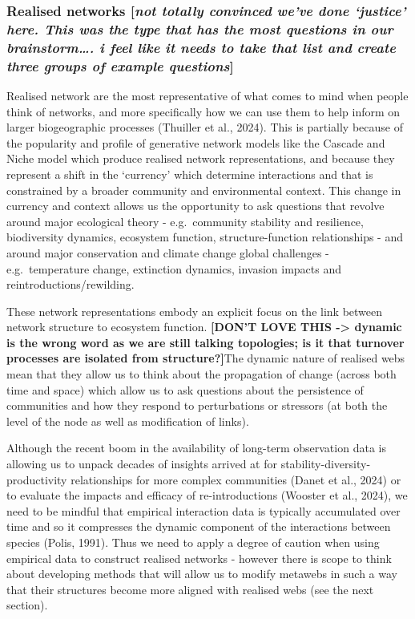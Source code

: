 \documentclass[
]{article}
\begin{document}
\subsubsection{\texorpdfstring{Realised networks {[}\emph{not totally
convinced we've done `justice' here. This was the type that has the most
questions in our brainstorm\ldots. i feel like it needs to take that
list and create three groups of example
questions}{]}}{Realised networks {[}not totally convinced we've done `justice' here. This was the type that has the most questions in our brainstorm\ldots. i feel like it needs to take that list and create three groups of example questions{]}}}\label{realised-networks-not-totally-convinced-weve-done-justice-here.-this-was-the-type-that-has-the-most-questions-in-our-brainstorm.-i-feel-like-it-needs-to-take-that-list-and-create-three-groups-of-example-questions}

Realised network are the most representative of what comes to mind when
people think of networks, and more specifically how we can use them to
help inform on larger biogeographic processes (Thuiller et al., 2024).
This is partially because of the popularity and profile of generative
network models like the Cascade and Niche model which produce realised
network representations, and because they represent a shift in the
`currency' which determine interactions and that is constrained by a
broader community and environmental context. This change in currency and
context allows us the opportunity to ask questions that revolve around
major ecological theory - e.g.~community stability and resilience,
biodiversity dynamics, ecosystem function, structure-function
relationships - and around major conservation and climate change global
challenges - e.g.~temperature change, extinction dynamics, invasion
impacts and reintroductions/rewilding.

These network representations embody an explicit focus on the link
between network structure to ecosystem function. \textbf{{[}DON'T LOVE
THIS -\textgreater{} dynamic is the wrong word as we are still talking
topologies; is it that turnover processes are isolated from
structure?{]}}The dynamic nature of realised webs mean that they allow
us to think about the propagation of change (across both time and space)
which allow us to ask questions about the persistence of communities and
how they respond to perturbations or stressors (at both the level of the
node as well as modification of links).

Although the recent boom in the availability of long-term observation
data is allowing us to unpack decades of insights arrived at for
stability-diversity-productivity relationships for more complex
communities (Danet et al., 2024) or to evaluate the impacts and efficacy
of re-introductions (Wooster et al., 2024), we need to be mindful that
empirical interaction data is typically accumulated over time and so it
compresses the dynamic component of the interactions between species
(Polis, 1991). Thus we need to apply a degree of caution when using
empirical data to construct realised networks - however there is scope
to think about developing methods that will allow us to modify metawebs
in such a way that their structures become more aligned with realised
webs (see the next section).
\end{document}
